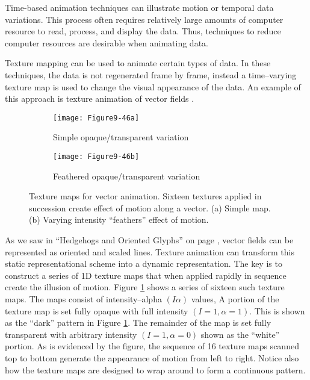 Time-based animation techniques can illustrate motion or temporal data variations. This process often requires relatively large amounts of computer resource to read, process, and display the data. Thus, techniques to reduce computer resources are desirable when animating data.

Texture mapping can be used to animate certain types of data. In these techniques, the data is not regenerated frame by frame, instead a time--varying texture map is used to change the visual appearance of the data. An example of this approach is texture animation of vector fields \cite{Yamrom95}.

\begin{figure}[htb]
	\begin{subfigure}[h]{0.32\linewidth}
		\texttt{[image: Figure9-46a]}
		\captionsetup{justification=centering}
		\caption{Simple opaque/transparent variation}
		\label{fig:Figure9-46a}
	\end{subfigure}
	\hfill
	\begin{subfigure}[h]{0.64\linewidth}
		\texttt{[image: Figure9-46b]}
		\captionsetup{justification=centering}
		\caption{Feathered opaque/transparent variation}
		\label{fig:Figure9-46b}
	\end{subfigure}
	\caption{Texture maps for vector animation. Sixteen textures applied in succession create effect of motion along a vector. (a) Simple map. (b) Varying intensity ``feathers'' effect of motion.}\label{fig:Figure9-46}
\end{figure}

As we saw in ``Hedgehogs and Oriented Glyphs'' on page \pageref{subsec:hedgehogs_oriented_glyphs}, vector fields can be represented as oriented and scaled lines. Texture animation can transform this static representational scheme into a dynamic representation. The key is to construct a series of 1D texture maps that when applied rapidly in sequence create the illusion of motion. Figure \ref{fig:Figure9-46a} shows a series of sixteen such texture maps. The maps consist of intensity--alpha $(I \alpha )$ values, A portion of the texture map is set fully opaque with full intensity $(I = 1, \alpha  = 1 )$. This is shown as the ``dark'' pattern in Figure \ref{fig:Figure9-46a}. The remainder of the map is set fully transparent with arbitrary intensity $( I = 1, \alpha = 0 )$ shown as the ``white'' portion. As is evidenced by the figure, the sequence of 16 texture maps scanned top to bottom generate the appearance of motion from left to right. Notice also how the texture maps are designed to wrap around to form a continuous pattern.

